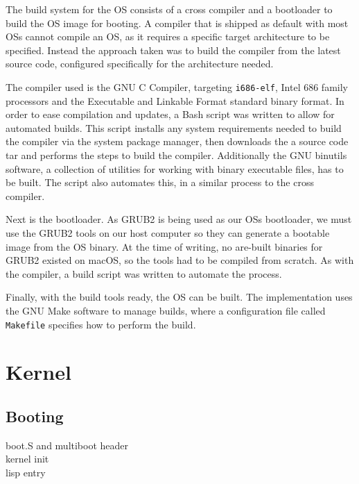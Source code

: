 \documentclass[11pt]{report}
\begin{document}
The build system for the OS consists of a cross compiler and a bootloader to build the OS image for booting. A compiler that is shipped as default with most OSs cannot compile an OS, as it requires a specific target architecture to be specified. Instead the approach taken was to build the compiler from the latest source code, configured specifically for the architecture needed.

The compiler used is the GNU C Compiler, targeting \texttt{i686-elf}, Intel 686 family processors and the Executable and Linkable Format standard binary format. In order to ease compilation and updates, a Bash script was written to allow for automated builds. This script installs any system requirements needed to build the compiler via the system package manager, then downloads the a source code tar and performs the steps to build the compiler. Additionally the GNU binutils software, a collection of utilities for working with binary executable files, has to be built. The script also automates this, in a similar process to the cross compiler.

%  

Next is the bootloader. As GRUB2 is being used as our OSs bootloader, we must use the GRUB2 tools on our host computer so they can generate a bootable image from the OS binary. At the time of writing, no are-built binaries for GRUB2 existed on macOS, so the tools had to be compiled from scratch. As with the compiler, a build script was written to automate the process.

Finally, with the build tools ready, the OS can be built. The implementation uses the GNU Make software to manage builds, where a configuration file called \texttt{Makefile} specifies how to perform the build.



\section{Kernel}
\subsection{Booting}
boot.S and multiboot header \\
kernel init \\
lisp entry \\
\end{document}
